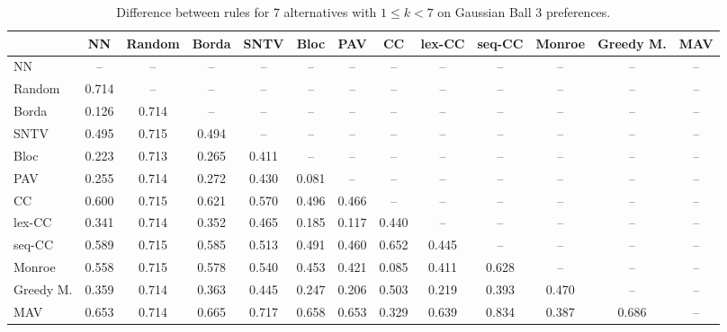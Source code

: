 
\begin{table*}[htbp]
\centering
\begin{tabular}{lcccccccccccc}
\toprule
 & NN & Random & Borda & SNTV & Bloc & PAV & CC & lex-CC & seq-CC & Monroe & Greedy M. & MAV \\
\midrule
NN & -- & -- & -- & -- & -- & -- & -- & -- & -- & -- & -- & -- \\
Random & \cellcolor{blue!71} 0.714 & -- & -- & -- & -- & -- & -- & -- & -- & -- & -- & -- \\
Borda & \cellcolor{blue!12} 0.126 & \cellcolor{blue!71} 0.714 & -- & -- & -- & -- & -- & -- & -- & -- & -- & -- \\
SNTV & \cellcolor{blue!49} 0.495 & \cellcolor{blue!71} 0.715 & \cellcolor{blue!49} 0.494 & -- & -- & -- & -- & -- & -- & -- & -- & -- \\
Bloc & \cellcolor{blue!22} 0.223 & \cellcolor{blue!71} 0.713 & \cellcolor{blue!26} 0.265 & \cellcolor{blue!41} 0.411 & -- & -- & -- & -- & -- & -- & -- & -- \\
PAV & \cellcolor{blue!25} 0.255 & \cellcolor{blue!71} 0.714 & \cellcolor{blue!27} 0.272 & \cellcolor{blue!43} 0.430 & \cellcolor{blue!8} 0.081 & -- & -- & -- & -- & -- & -- & -- \\
CC & \cellcolor{blue!60} 0.600 & \cellcolor{blue!71} 0.715 & \cellcolor{blue!62} 0.621 & \cellcolor{blue!56} 0.570 & \cellcolor{blue!49} 0.496 & \cellcolor{blue!46} 0.466 & -- & -- & -- & -- & -- & -- \\
lex-CC & \cellcolor{blue!34} 0.341 & \cellcolor{blue!71} 0.714 & \cellcolor{blue!35} 0.352 & \cellcolor{blue!46} 0.465 & \cellcolor{blue!18} 0.185 & \cellcolor{blue!11} 0.117 & \cellcolor{blue!44} 0.440 & -- & -- & -- & -- & -- \\
seq-CC & \cellcolor{blue!58} 0.589 & \cellcolor{blue!71} 0.715 & \cellcolor{blue!58} 0.585 & \cellcolor{blue!51} 0.513 & \cellcolor{blue!49} 0.491 & \cellcolor{blue!46} 0.460 & \cellcolor{blue!65} 0.652 & \cellcolor{blue!44} 0.445 & -- & -- & -- & -- \\
Monroe & \cellcolor{blue!55} 0.558 & \cellcolor{blue!71} 0.715 & \cellcolor{blue!57} 0.578 & \cellcolor{blue!54} 0.540 & \cellcolor{blue!45} 0.453 & \cellcolor{blue!42} 0.421 & \cellcolor{blue!8} 0.085 & \cellcolor{blue!41} 0.411 & \cellcolor{blue!62} 0.628 & -- & -- & -- \\
Greedy M. & \cellcolor{blue!35} 0.359 & \cellcolor{blue!71} 0.714 & \cellcolor{blue!36} 0.363 & \cellcolor{blue!44} 0.445 & \cellcolor{blue!24} 0.247 & \cellcolor{blue!20} 0.206 & \cellcolor{blue!50} 0.503 & \cellcolor{blue!21} 0.219 & \cellcolor{blue!39} 0.393 & \cellcolor{blue!47} 0.470 & -- & -- \\
MAV & \cellcolor{blue!65} 0.653 & \cellcolor{blue!71} 0.714 & \cellcolor{blue!66} 0.665 & \cellcolor{blue!71} 0.717 & \cellcolor{blue!65} 0.658 & \cellcolor{blue!65} 0.653 & \cellcolor{blue!32} 0.329 & \cellcolor{blue!63} 0.639 & \cellcolor{blue!83} 0.834 & \cellcolor{blue!38} 0.387 & \cellcolor{blue!68} 0.686 & -- \\
\bottomrule
\end{tabular}

\caption{Difference between rules for 7 alternatives with $1 \leq k < 7$ on Gaussian Ball 3 preferences.}
\label{tab:rule_distance_heatmap-m=[7]-pref_dist=euclidean__args__dimensions=3_-_space=gaussian_ball}
\end{table*}
    